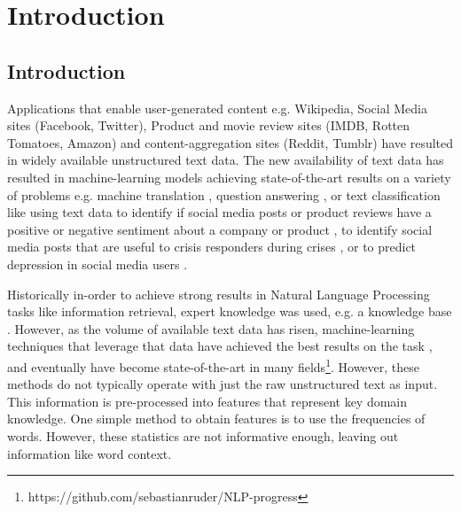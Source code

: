\chapter{Introduction}





\section{Introduction}



Applications that enable user-generated content e.g. Wikipedia, Social Media sites (Facebook, Twitter), Product and movie review sites (IMDB, Rotten Tomatoes, Amazon) and content-aggregation sites (Reddit, Tumblr) have resulted in widely available unstructured text data. The new availability of text data has resulted in machine-learning models achieving state-of-the-art results on  a variety of problems e.g. machine translation \cite{Wu}, question answering \cite{Fisch2016}, or text classification like using text data to identify if social media posts or product reviews have a positive or negative sentiment about a company or product \cite{Burel2018}, to identify social media posts  that are useful to crisis responders during crises \cite{Burel2018}, or to predict depression in social media users \cite{Aldarwish2017}. 


Historically in-order to achieve strong results in Natural Language Processing tasks like information retrieval, expert knowledge was used, e.g. a knowledge base \cite{Lewis1993}. However, as the volume of available text data has risen,  machine-learning techniques that leverage that data have achieved the best results on the task \cite{Zhang2016a}, and eventually have become state-of-the-art in many fields\footnote{https://github.com/sebastianruder/NLP-progress}. However, these methods do not typically operate with just the raw unstructured text as input. This information is pre-processed into features that represent key domain knowledge. One simple method to obtain features is to use the  frequencies of words. However, these statistics are not informative enough, leaving out information like word context.  %

